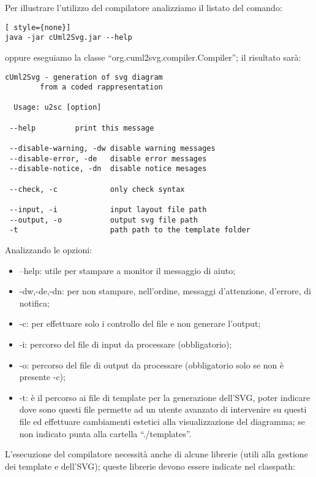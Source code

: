 Per illustrare l'utilizzo del compilatore analizziamo il listato del comando:

\begin{lstlisting}[ style={none}]
java -jar cUml2Svg.jar --help
\end{lstlisting}

oppure eseguiamo la classe ``org.cuml2svg.compiler.Compiler''; il risultato sarà:

\begin{lstlisting}[caption={Output dell'help da linea di comando}, style={none}]
cUml2Svg - generation of svg diagram
        from a coded rappresentation

  Usage: u2sc [option]
 
 --help         print this message
 
 --disable-warning, -dw disable warning messages
 --disable-error, -de   disable error messages
 --disable-notice, -dn  disable notice mesages
 
 --check, -c            only check syntax
 
 --input, -i            input layout file path
 --output, -o           output svg file path
 -t                     path path to the template folder
\end{lstlisting}

Analizzando le opzioni:

\begin{itemize}
  \item --help: utile per stampare a monitor il messaggio di aiuto;
  \item -dw,-de,-dn: per non stampare, nell'ordine, messaggi d'attenzione,
  d'errore, di notifica;
  \item -c: per effettuare solo i controllo del file e non generare l'output;
  \item -i: percorso del file di input da processare (obbligatorio);
  \item -o: percorso del file di output da processare (obbligatorio solo se non
  è presente -c);
  \item -t: è il percorso ai file di template per la generazione dell'SVG, poter
  indicare dove sono questi file permette ad un utente avanzato di intervenire
  su questi file ed effettuare cambiamenti estetici alla visualizzazione del
  diagramma; se non indicato punta alla cartella ``./templates''.
\end{itemize} 

L'esecuzione del compilatore necessità anche di alcune librerie (utili alla
gestione dei template e dell'SVG); queste librerie devono essere indicate nel
classpath:

